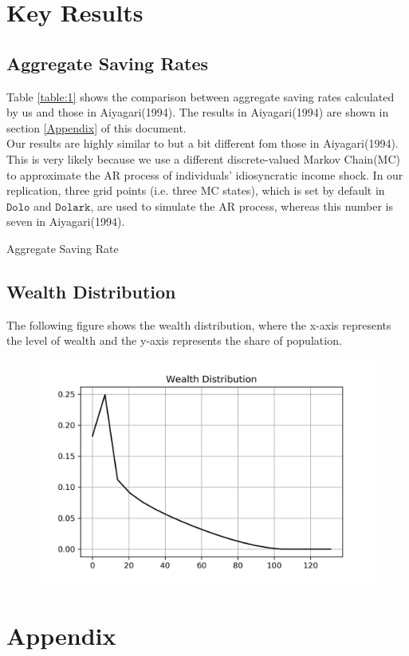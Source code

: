 \documentclass[]{article}
\begin{document}
\section{Key Results}
\subsection{Aggregate Saving Rates}
Table \ref{table:1} shows the comparison between aggregate saving rates calculated by us and those in Aiyagari(1994). The results in Aiyagari(1994) are shown in section \ref{Appendix} of this document.\\

Our results are highly similar to but a bit different fom those in Aiyagari(1994). This is very likely because we use a different discrete-valued Markov Chain(MC) to approximate the AR process of individuals' idiosyncratic income shock. In our replication, three grid points (i.e. three MC states), which is set by default in $\texttt{Dolo}$ and $\texttt{Dolark}$, are used to simulate the AR process, whereas this number is seven in Aiyagari(1994).
\begin{table}[H]
	\scalebox{.7}{}
	\caption{Aggregate Saving Rate}
	\label{table:2}
\end{table}


\subsection{Wealth Distribution}
The following figure shows the wealth distribution, where the x-axis represents the level of wealth and the y-axis represents the share of population.
\begin{figure}[H]
	\centering
	\includegraphics{Figures/Figure_WealthDistribution}
	\label{figure:1}
\end{figure}

\newpage
\section{Appendix}{\label{Appendix}}
	

\newpage 




\end{document}
